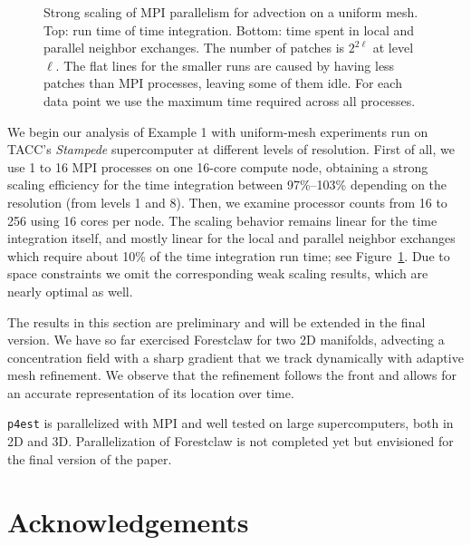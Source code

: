 \documentclass{IOS-Book-Article}     %
\newcommand{\forestclaw}{Forestclaw\xspace}
\newcommand{\pforest}{\texttt{p4est}\xspace}
\newcommand{\Fig}[1]{Figure~\ref{fig:#1}}
\begin{document}
\begin{figure}
\begin{center}
\end{center}
\caption{Strong scaling of MPI parallelism for advection on a uniform mesh.
  Top: run time of time integration.  Bottom: time spent in local and parallel
  neighbor exchanges.  The number of patches is $2^{2 \ell}$ at level $\ell$.
  The flat lines for the smaller runs are caused by having
  less patches than MPI processes, leaving some of them idle.  For each data point
  we use the maximum time required across all processes.}
\label{fig:uniscale}
\end{figure}%
We begin our analysis of Example 1 with uniform-mesh experiments run on TACC's
\emph{Stampede} supercomputer at different levels of resolution.  First of all,
we use 1 to 16 MPI processes on one 16-core compute node, obtaining a strong
scaling efficiency for the time integration between 97\%--103\% depending on
the resolution (from levels 1 and 8).  Then, we examine processor counts from
16 to 256 using 16 cores per node.  The scaling behavior remains linear for
the time integration itself, and mostly linear for the local and parallel
neighbor exchanges which require about 10\% of the time integration run time;
see Figure~\ref{fig:uniscale}.  Due to space constraints we omit the
corresponding weak scaling results, which are nearly optimal as well.















The results in this section are preliminary and will be extended in the final
version.  We have so far exercised \forestclaw for two 2D manifolds,
advecting a concentration field with a sharp gradient that we track dynamically
with adaptive mesh refinement.  We observe that the refinement follows the
front and allows for an accurate representation of its location over time.

\pforest is parallelized with MPI and well tested on large supercomputers, both
in 2D and 3D.  Parallelization of \forestclaw is not completed yet but
envisioned for the final version of the paper.

\section*{Acknowledgements}
\end{document}
